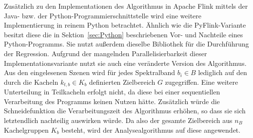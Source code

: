 Zusätzlich zu den Implementationen des Algorithmus in Apache Flink mittels der Java- bzw. der Python-Programmierschnittstelle wird eine weitere Implementierung in reinem Python betrachtet. Ähnlich wie die PyFlink-Variante besitzt diese die in Sektion~\ref{sec:Python} beschriebenen Vor- und Nachteile eines Python-Programms. Sie nutzt außerdem dieselbe Bibliothek für die Durchführung der Regression. Aufgrund der mangelnden Parallelisierbarkeit dieser Implementationsvariante nutzt sie auch eine veränderte Version des Algorithmus. Aus den eingelesenen Szenen wird für jedes Spektralband $b_i \in B $ lediglich auf den durch die Kacheln $k_{t, b} \in K_{b}$ definierten Zielbereich $G$ zugegriffen. Eine weitere Unterteilung in Teilkacheln erfolgt nicht, da diese bei einer sequentiellen Verarbeitung des Programms keinen Nutzen hätte. Zusätzlich würde die Schneidefunktion die Verarbeitungszeit des Algorithmus erhöhen, so dass sie sich letztendlich nachteilig auswirken würde. Da also der gesamte Zielbereich aus $n_B$ Kachelgruppen $K_b$ besteht, wird der Analysealgorithmus auf diese angewendet. 




